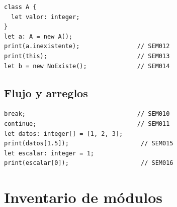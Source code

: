 \documentclass[11pt,letterpaper,oneside]{report}
\begin{document}
\begin{verbatim}
class A {
  let valor: integer;
}
let a: A = new A();
print(a.inexistente);                // SEM012
print(this);                         // SEM013
let b = new NoExiste();              // SEM014
\end{verbatim}

\section{Flujo y arreglos}

\begin{verbatim}
break;                               // SEM010
continue;                            // SEM011
let datos: integer[] = [1, 2, 3];
print(datos[1.5]);                    // SEM015
let escalar: integer = 1;
print(escalar[0]);                    // SEM016
\end{verbatim}

\chapter{Inventario de módulos}
\end{document}
